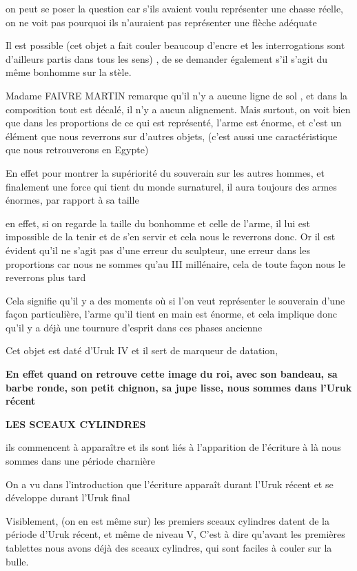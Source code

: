 \documentclass[a4paper,10pt]{article}
\begin{document}
on peut se poser la question car s'ils avaient voulu
représenter une chasse réelle, on ne voit pas pourquoi ils
n'auraient pas représenter une flèche adéquate

Il est possible (cet objet a fait couler beaucoup
d'encre et les interrogations sont
d'ailleurs partis dans tous les  sens) , de se
demander également s'il s'agit du
même bonhomme sur la stèle.

Madame FAIVRE MARTIN remarque qu'il
n'y a aucune ligne de sol , et dans la composition
tout est décalé, il n'y a aucun alignement. Mais
surtout, on voit bien que dans les proportions de ce qui est
représenté, l'arme est énorme, et
c'est un élément que nous reverrons sur
d'autres objets,  (c'est aussi une
caractéristique que nous retrouverons en Egypte)

En effet pour montrer la supériorité du souverain sur les autres hommes,
et finalement une force qui tient du monde surnaturel, il aura toujours
des armes énormes, par rapport à sa taille 

en effet, si on regarde la taille du bonhomme et celle de
l'arme, il lui est impossible de la tenir et de
s'en servir et cela  nous le reverrons donc. Or il est
évident qu'il ne s'agit pas
d'une erreur du sculpteur, une erreur dans les
proportions car nous ne sommes qu'au III millénaire,
cela de toute façon nous le reverrons plus tard

Cela signifie qu'il y a des moments où si
l'on veut représenter le souverain
d'une façon particulière, l'arme
qu'il tient en main est énorme, et cela implique donc
qu'il y a déjà une tournure d'esprit
dans ces phases ancienne

Cet objet est daté d'Uruk IV et il sert de marqueur de
datation, 

\textbf{En effet quand on retrouve cette  image du roi, avec son
bandeau, sa barbe ronde, son petit chignon, sa jupe lisse, nous sommes
dans l'Uruk récent}

\textbf{LES SCEAUX CYLINDRES}

ils commencent à apparaître et ils sont liés à
l'apparition de l'écriture à là nous
sommes dans une période charnière

On a vu dans l'introduction que
l'écriture apparaît durant l'Uruk
récent et se développe durant l'Uruk final

Visiblement, (on en est même sur) les premiers sceaux cylindres datent
de la période d'Uruk récent, et même de niveau V,
C'est à dire qu'avant les premières
tablettes nous avons déjà des sceaux cylindres, qui sont faciles à
couler sur la bulle.
\end{document}
